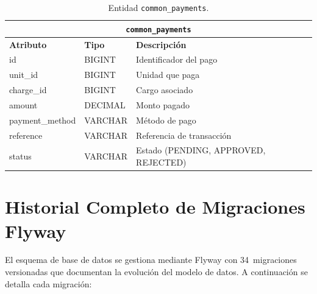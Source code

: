 \begin{table}[H]
\centering
\small
\begin{tabular}{|p{}|p{}|p{}|}
\hline
\multicolumn{3}{|c|}{\textbf{\texttt{common\_payments}}} \\ \hline
\textbf{Atributo} & \textbf{Tipo} & \textbf{Descripción} \\ \hline
id & BIGINT & Identificador del pago \\ \hline
unit\_id & BIGINT & Unidad que paga \\ \hline
charge\_id & BIGINT & Cargo asociado \\ \hline
amount & DECIMAL & Monto pagado \\ \hline
payment\_method & VARCHAR & Método de pago \\ \hline
reference & VARCHAR & Referencia de transacción \\ \hline
status & VARCHAR & Estado (PENDING, APPROVED, REJECTED) \\ \hline
\end{tabular}
\caption{Entidad \texttt{common\_payments}.}
\end{table}

\section{Historial Completo de Migraciones Flyway}

El esquema de base de datos se gestiona mediante Flyway con 34~migraciones versionadas que documentan la evolución del modelo de datos. A continuación se detalla cada migración:

